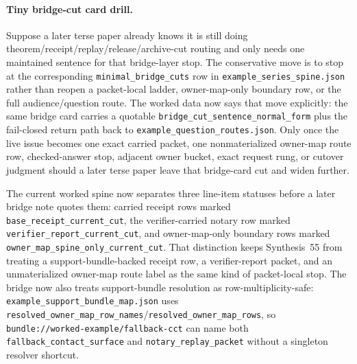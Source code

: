 \documentclass[11pt]{article}
\begin{document}
\paragraph{Tiny bridge-cut card drill.}
Suppose a later terse paper already knows it is still doing theorem/receipt/replay/release/archive-cut routing and only needs one maintained sentence for that bridge-layer stop. The conservative move is to stop at the corresponding \texttt{minimal\_bridge\_cuts} row in \nolinkurl{example\_series\_spine.json} rather than reopen a packet-local ladder, owner-map-only boundary row, or the full audience/question route. The worked data now says that move explicitly: the same bridge card carries a quotable \texttt{bridge\_cut\_sentence\_normal\_form} plus the fail-closed return path back to \texttt{example\_question\_routes.json}. Only once the live issue becomes one exact carried packet, one nonmaterialized owner-map route row, checked-answer stop, adjacent owner bucket, exact request rung, or cutover judgment should a later terse paper leave that bridge-card cut and widen further.\cite{series:workedexample}

The current worked spine now separates three line-item statuses before a later bridge note quotes them: carried receipt rows marked \texttt{base\_receipt\_current\_cut}, the verifier-carried notary row marked \texttt{verifier\_report\_current\_cut}, and owner-map-only boundary rows marked \texttt{owner\_map\_spine\_only\_current\_cut}. That distinction keeps Synthesis~55 from treating a support-bundle-backed receipt row, a verifier-report packet, and an unmaterialized owner-map route label as the same kind of packet-local stop. The bridge now also treats support-bundle resolution as row-multiplicity-safe: \nolinkurl{example_support_bundle_map.json} uses \nolinkurl{resolved_owner_map_row_names}/\nolinkurl{resolved_owner_map_rows}, so \nolinkurl{bundle://worked-example/fallback-cct} can name both \nolinkurl{fallback_contact_surface} and \nolinkurl{notary_replay_packet} without a singleton resolver shortcut.
\end{document}

